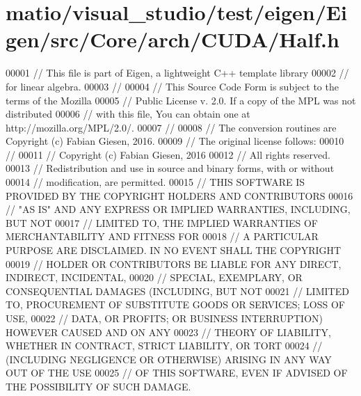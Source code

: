 \hypertarget{matio_2visual__studio_2test_2eigen_2_eigen_2src_2_core_2arch_2_c_u_d_a_2_half_8h_source}{}\section{matio/visual\+\_\+studio/test/eigen/\+Eigen/src/\+Core/arch/\+C\+U\+D\+A/\+Half.h}
\label{matio_2visual__studio_2test_2eigen_2_eigen_2src_2_core_2arch_2_c_u_d_a_2_half_8h_source}

\begin{DoxyCode}
00001 \textcolor{comment}{// This file is part of Eigen, a lightweight C++ template library}
00002 \textcolor{comment}{// for linear algebra.}
00003 \textcolor{comment}{//}
00004 \textcolor{comment}{// This Source Code Form is subject to the terms of the Mozilla}
00005 \textcolor{comment}{// Public License v. 2.0. If a copy of the MPL was not distributed}
00006 \textcolor{comment}{// with this file, You can obtain one at http://mozilla.org/MPL/2.0/.}
00007 \textcolor{comment}{//}
00008 \textcolor{comment}{// The conversion routines are Copyright (c) Fabian Giesen, 2016.}
00009 \textcolor{comment}{// The original license follows:}
00010 \textcolor{comment}{//}
00011 \textcolor{comment}{// Copyright (c) Fabian Giesen, 2016}
00012 \textcolor{comment}{// All rights reserved.}
00013 \textcolor{comment}{// Redistribution and use in source and binary forms, with or without}
00014 \textcolor{comment}{// modification, are permitted.}
00015 \textcolor{comment}{// THIS SOFTWARE IS PROVIDED BY THE COPYRIGHT HOLDERS AND CONTRIBUTORS}
00016 \textcolor{comment}{// "AS IS" AND ANY EXPRESS OR IMPLIED WARRANTIES, INCLUDING, BUT NOT}
00017 \textcolor{comment}{// LIMITED TO, THE IMPLIED WARRANTIES OF MERCHANTABILITY AND FITNESS FOR}
00018 \textcolor{comment}{// A PARTICULAR PURPOSE ARE DISCLAIMED. IN NO EVENT SHALL THE COPYRIGHT}
00019 \textcolor{comment}{// HOLDER OR CONTRIBUTORS BE LIABLE FOR ANY DIRECT, INDIRECT, INCIDENTAL,}
00020 \textcolor{comment}{// SPECIAL, EXEMPLARY, OR CONSEQUENTIAL DAMAGES (INCLUDING, BUT NOT}
00021 \textcolor{comment}{// LIMITED TO, PROCUREMENT OF SUBSTITUTE GOODS OR SERVICES; LOSS OF USE,}
00022 \textcolor{comment}{// DATA, OR PROFITS; OR BUSINESS INTERRUPTION) HOWEVER CAUSED AND ON ANY}
00023 \textcolor{comment}{// THEORY OF LIABILITY, WHETHER IN CONTRACT, STRICT LIABILITY, OR TORT}
00024 \textcolor{comment}{// (INCLUDING NEGLIGENCE OR OTHERWISE) ARISING IN ANY WAY OUT OF THE USE}
00025 \textcolor{comment}{// OF THIS SOFTWARE, EVEN IF ADVISED OF THE POSSIBILITY OF SUCH DAMAGE.}

\end{DoxyCode}

